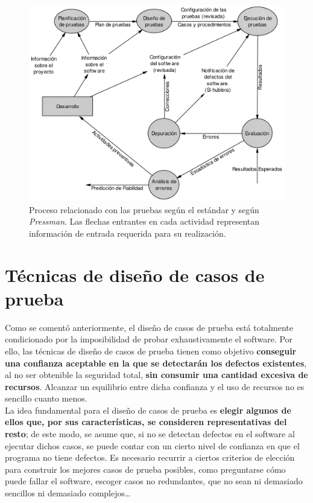 \begin{figure}[H]
    \centering
    \includegraphics[width=0.8\linewidth]{Resources/Tema6/ProcesoPruebas_IEEE_Pressman.png}
    \caption{Proceso relacionado con las pruebas según el estándar y según \textit{Pressman}. Las flechas entrantes en cada actividad representan información de entrada requerida para su realización.}
\end{figure}


\section{Técnicas de diseño de casos de prueba}

Como se comentó anteriormente, el diseño de casos de prueba está totalmente condicionado por la imposibilidad de probar exhaustivamente el software. Por ello, las técnicas de diseño de casos de prueba tienen como objetivo \textbf{conseguir una confianza aceptable en la que se detectarán los defectos existentes}, al no ser obtenible la seguridad total, \textbf{sin consumir una cantidad excesiva de recursos}. Alcanzar un equilibrio entre dicha confianza y el uso de recursos no es sencillo cuanto menos.\\

La idea fundamental para el diseño de casos de prueba es \textbf{elegir algunos de ellos que, por sus características, se consideren representativas del resto}; de este modo, se asume que, si no se detectan defectos en el software al ejecutar dichos casos, se puede contar con un cierto nivel de confianza en que el programa no tiene defectos. Es necesario recurrir a ciertos criterios de elección para construir los mejores casos de prueba posibles, como preguntarse cómo puede fallar el software, escoger casos no redundantes, que no sean ni demasiado sencillos ni demasiado complejos\ldots\\

